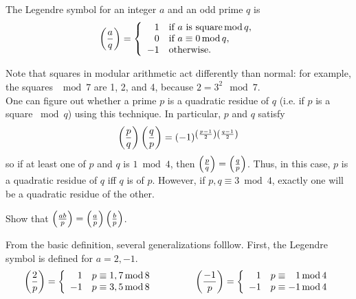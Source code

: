 %
\begin{defn} The Legendre symbol for an integer $a$ and an odd prime $q$ is
\[\jac{a}{q} = 
\left\{
\begin{array}{r l}
1 & \text{if }a\text{ is square}\bmod q,\\
0 & \text{if }a\equiv 0 \bmod q,\\
-1 & \text{otherwise.}
\end{array}
\right.%
\]
\end{defn}
Note that squares in modular arithmetic act differently than normal: for example, the squares $\mod 7$ are 1, 2, and 4, because $2 = 3^2\mod 7$.\\
One can figure out whether a prime $p$ is a quadratic residue of $q$ (i.e. if $p$ is a square $\bmod q$) using this technique. In particular, $p$ and $q$ satisfy
\[\left(\frac{p}{q}\right)\left(\frac{q}{p}\right) = (-1)^{\left(\frac{p-1}{2}\right)\left(\frac{q-1}{2}\right)}\]
so if at least one of $p$ and $q$ is $1\bmod 4$, then $\left(\frac{p}{q}\right) = \left(\frac{q}{p}\right)$. Thus, in this case, $p$ is a quadratic residue of $q$ iff $q$ is of $p$. However, if $p,q\equiv 3\bmod 4$, exactly one will be a quadratic residue of the other.
\begin{ex}
Show that $\left(\frac{ab}{p}\right) = \left(\frac{a}{p}\right)\left(\frac{b}{p}\right)$.
\end{ex}
From the basic definition, several generalizations folllow. First, the Legendre symbol is defined for $a = 2,-1$.
\[\left(\frac{2}{p}\right) = 
\left\{
\begin{array}{rl}
1 & p\equiv 1, 7 \operatorname{mod} 8\\
-1 & p\equiv 3,5 \operatorname{mod} 8
\end{array}\right. \qquad\qquad
\left(\frac{-1}{p}\right) = 
\left\{
\begin{array}{rl}
1& p\equiv \phantom{-}1\operatorname{mod} 4\\
-1& p\equiv -1\operatorname{mod} 4
\end{array}
\right.\]
